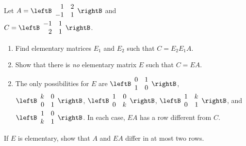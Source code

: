 \begin{multicols}{2}
\begin{ex}
Let $A = \leftB \begin{array}{rr}
1 & 2 \\
-1 & 1
\end{array} \rightB$
 and \\ $C = \leftB \begin{array}{rr}
 -1 & 1 \\
 2 & 1
 \end{array} \rightB$.

\begin{enumerate}[label={\alph*.}]
\item Find elementary matrices $E_{1}$ and $E_{2}$ such that $C = E_{2}E_{1}A$.

\item Show that there is \textit{no} elementary matrix $E$ such that $C = EA$.

\end{enumerate}
\begin{sol}
\begin{enumerate}[label={\alph*.}]
\setcounter{enumi}{1}
\item The only possibilities for $E$ are $\leftB \begin{array}{rr}
0 & 1 \\
1 & 0
\end{array} \rightB$, $ 
\leftB \begin{array}{rr}
k & 0 \\
0 & 1
\end{array} \rightB$, $ 
\leftB \begin{array}{rr}
1 & 0 \\
0 & k
\end{array} \rightB$, $ 
\leftB \begin{array}{rr}
1 & k \\
0 & 1
\end{array} \rightB$, and $\leftB \begin{array}{rr}
 1 & 0 \\
 k & 1
 \end{array} \rightB$. In each case, $EA$ has a row different from $C$.

\end{enumerate}
\end{sol}
\end{ex}

\begin{ex}
If $E$ is elementary, show that $A$ and $EA$ differ in at most two rows.
\end{ex}


\end{multicols}
